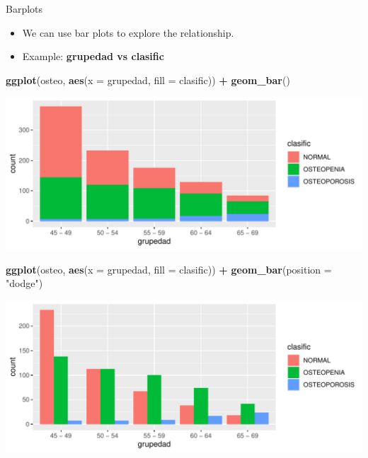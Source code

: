\documentclass[
  ignorenonframetext,
]{beamer}
\newenvironment{Shaded}{\begin{snugshade}}{\end{snugshade}}
\newcommand{\AttributeTok}[1]{\textcolor[rgb]{0.13,0.29,0.53}{#1}}
\newcommand{\FunctionTok}[1]{\textcolor[rgb]{0.13,0.29,0.53}{\textbf{#1}}}
\newcommand{\NormalTok}[1]{#1}
\newcommand{\SpecialCharTok}[1]{\textcolor[rgb]{0.81,0.36,0.00}{\textbf{#1}}}
\newcommand{\StringTok}[1]{\textcolor[rgb]{0.31,0.60,0.02}{#1}}
\providecommand{\tightlist}{%
  \setlength{\itemsep}{0pt}\setlength{\parskip}{0pt}}
\begin{document}
\begin{frame}[fragile]{Barplots}
\label{barplots}
\begin{itemize}
\tightlist
\item
  We can use bar plots to explore the relationship.
\item
  Example: \textbf{grupedad vs clasific}
\end{itemize}

\begin{Shaded}
\begin{Highlighting}[]
\FunctionTok{ggplot}\NormalTok{(osteo, }\FunctionTok{aes}\NormalTok{(}\AttributeTok{x =}\NormalTok{ grupedad, }\AttributeTok{fill =}\NormalTok{ clasific)) }\SpecialCharTok{+} 
  \FunctionTok{geom\_bar}\NormalTok{()}
\end{Highlighting}
\end{Shaded}

\includegraphics{StatisticsWithR-3-Exploratory_Analysis_II_And_Graphics_files/figure-beamer/unnamed-chunk-8-1.pdf}

\begin{Shaded}
\begin{Highlighting}[]
\FunctionTok{ggplot}\NormalTok{(osteo, }\FunctionTok{aes}\NormalTok{(}\AttributeTok{x =}\NormalTok{ grupedad, }\AttributeTok{fill =}\NormalTok{ clasific)) }\SpecialCharTok{+} 
  \FunctionTok{geom\_bar}\NormalTok{(}\AttributeTok{position =} \StringTok{"dodge"}\NormalTok{)}
\end{Highlighting}
\end{Shaded}

\includegraphics{StatisticsWithR-3-Exploratory_Analysis_II_And_Graphics_files/figure-beamer/unnamed-chunk-9-1.pdf}
\end{frame}
\end{document}
